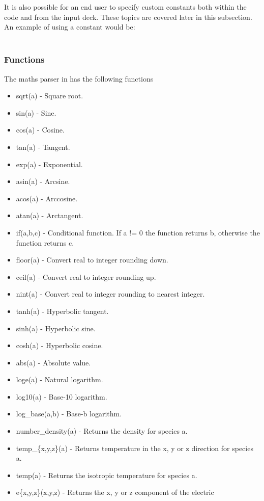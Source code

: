 \documentclass[12pt,a4paper]{article}
\newcommand{\inlinecode}[1]{{\color{warwickred} \bf\texttt{#1}}}
\newcommand{\EPOCH}{{\color{warwickdark}\fontfamily{phv}\selectfont{EPOCH}}}
\begin{document}
It is also possible for an end user to specify custom constants both within
the code and from the input deck. These topics are covered later in this
subsection. An example of using a constant would be:\\
\indent\inlinecode{length\_x = pi}\\

\subsubsection{Functions}
\label{sec:functions}
The maths parser in {\EPOCH} has the following functions
\begin{itemize}
\item sqrt(a) - Square root.
\item sin(a) - Sine.
\item cos(a) - Cosine.
\item tan(a) - Tangent.
\item exp(a) - Exponential.
\item asin(a) - Arcsine.
\item acos(a) - Arccosine.
\item atan(a) - Arctangent.
\item if(a,b,c) - Conditional function. If a != 0 the function returns b,
  otherwise the function returns c.
\item floor(a) - Convert real to integer rounding down.
\item ceil(a) - Convert real to integer rounding up.
\item nint(a) - Convert real to integer rounding to nearest integer.
\item tanh(a) - Hyperbolic tangent.
\item sinh(a) - Hyperbolic sine.
\item cosh(a) - Hyperbolic cosine.
\item abs(a) - Absolute value.
\item loge(a) - Natural logarithm.
\item log10(a) - Base-10 logarithm.
\item log\_base(a,b) - Base-b logarithm.
\item number\_density(a) - Returns the density for species a.
\item temp\_\{x,y,z\}(a) - Returns temperature in the x, y or z direction for species a.
\item temp(a) - Returns the isotropic temperature for species a.
\item e\{x,y,z\}(x,y,z) - Returns the x, y or z component of the electric

\end{itemize}
\end{document}
